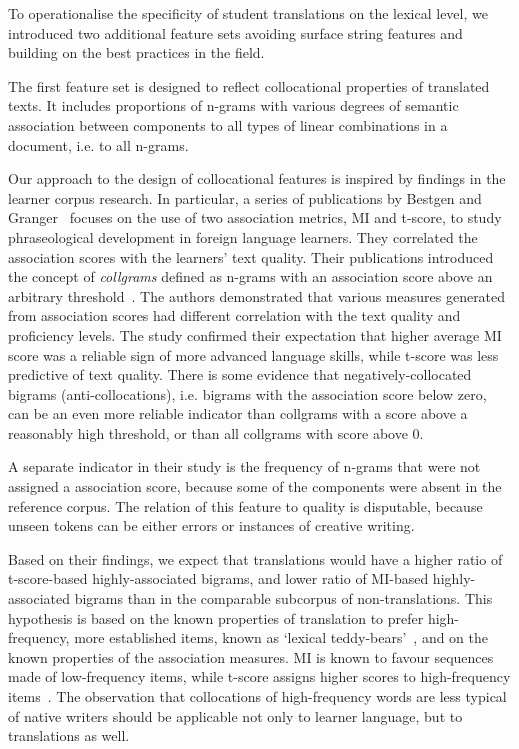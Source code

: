 To operationalise the specificity of student translations on the lexical level, we introduced two additional feature sets avoiding surface string features and building on the best practices in the field.  

The first feature set is designed to reflect collocational properties of translated texts. It includes proportions of n-grams with various degrees of semantic association between components to all types of linear combinations in a document, i.e. to all n-grams. 

Our approach to the design of collocational features is inspired by findings in the learner corpus research. In particular, a series of publications by Bestgen and Granger~\cite{Bestgen2014,Bestgen2017,Granger2017} focuses on the use of two association metrics, \gls{MI} and t-score, to study phraseological development in foreign language learners. They correlated the association scores with the learners' text quality. Their publications introduced the concept of \textit{collgrams} defined as n-grams with an association score above an arbitrary threshold~\cite{Bestgen2014}. The authors demonstrated that various measures generated from association scores had different correlation with the text quality and proficiency levels. The study confirmed their expectation that higher average MI score was a reliable sign of more advanced language skills, while t-score was less predictive of text quality. 
There is some evidence that negatively-collocated bigrams (anti-collocations), i.e. bigrams with the association score below zero, can be an even more reliable indicator than collgrams with a score above a reasonably high threshold, or than all collgrams with score above 0. 

A separate indicator in their study is the frequency of n-grams that were not assigned a association score, because some of the components were absent in the reference corpus. The relation of this feature to quality is disputable, because unseen tokens can be either errors or instances of creative writing. 

\label{pg:why_collocations}
Based on their findings, we expect that translations would have a higher ratio of t-score-based highly-associated bigrams, and lower ratio of MI-based highly-associated bigrams than in the comparable subcorpus of non-translations.
This hypothesis is based on the known properties of translation to prefer high-frequency, more established items, known as `lexical teddy-bears'~\cite[p.123]{Johansson2008}, and on the known properties of the association measures. MI is known to favour sequences made of low-frequency items, while t-score assigns higher scores to high-frequency items~\cite{Gries2010}. The observation that collocations of high-frequency words are less typical of native writers should be applicable not only to learner language, but to translations as well. 

